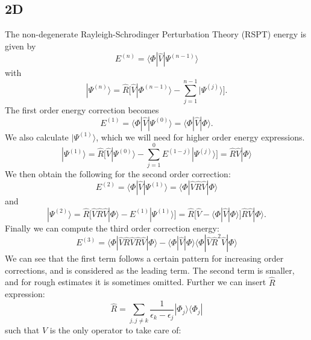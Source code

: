 \documentclass[norsk,a4paper,12pt]{article}
\begin{document}
\subsection*{2D}
The non-degenerate Rayleigh-Schrodinger Perturbation Theory (RSPT) energy is given by
\begin{equation}
E^{(n)}=\langle \Phi|\hat{V}|\Psi^{(n-1)}\rangle
\end{equation}
with
\begin{equation}
|\Psi^{(n)}\rangle=\hat{R}\bigg[\hat{V}|\Phi^{(n-1)}\rangle-\sum_{j=1}^{n-1}|\Psi^{(j)}\rangle\bigg].
\end{equation}
The first order energy correction becomes
\begin{equation*}
E^{(1)}=\langle\Phi|\hat{V}|\Psi^{(0)}\rangle=\langle\Phi|\hat{V}|\Phi\rangle.
\end{equation*}
We also calculate $|\Psi^{(1)}\rangle$, which we will need for higher order energy expressions. 
\begin{equation*}
|\Psi^{(1)}\rangle=\hat{R}\bigg[\hat{V}|\Psi^{(0)}\rangle-\sum_{j=1}^{0}E^{(1-j)}|\Psi^{(j)}\rangle\bigg]=\hat{R}\hat{V}|\Phi\rangle
\end{equation*}
We then obtain the following for the second order correction:
\begin{equation*}
E^{(2)}=\langle\Phi|\hat{V}|\Psi^{(1)}\rangle=\langle\Phi|\hat{V}\hat{R}\hat{V}|\Phi\rangle
\end{equation*}
and
\begin{equation*}
|\Psi^{(2)}\rangle=\hat{R}\bigg[\hat{V}\hat{R}\hat{V}|\Phi\rangle-E^{(1)}|\Psi^{(1)}\rangle\bigg]=\hat{R}\bigg[\hat{V}-\langle\Phi|\hat{V}|\Phi\rangle\bigg]\hat{R}\hat{V}|\Phi\rangle.
\end{equation*}
Finally we can compute the third order correction energy:
\begin{equation*}
E^{(3)}=\langle\Phi|\hat{V}\hat{R}\hat{V}\hat{R}\hat{V}|\Phi\rangle-\langle\Phi|\hat{V}|\Phi\rangle\langle\Phi|\hat{V}\hat{R}^2\hat{V}|\Phi\rangle
\end{equation*}
We can see that the first term follows a certain pattern for increasing order corrections, and is considered as the leading term. The second term is smaller, and for rough estimates it is sometimes omitted. Further we can insert $\hat{R}$ expression:
\begin{equation}
\hat{R}=\sum_{j,j\neq k}\frac{1}{\epsilon_k-\epsilon_j}|\Phi_j\rangle\langle\Phi_j|
\end{equation}
such that $\hat{V}$ is the only operator to take care of:
\end{document}
